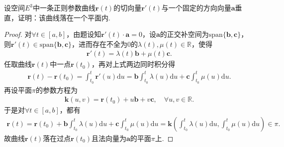 \documentclass[../../main.tex]{subfiles}%
\begin{document}
\begin{example}
设空间$E^3$中一条正则参数曲线$\bm{r}(t)$的切向量$\bm{r}'(t)$与一个固定的方向向量$\bm{a}$垂直，证明：该曲线落在一个平面内.
\end{example}
\begin{proof}

对$\forall t\in[a,b]$，由题设知$\boldsymbol{r}'(t)\cdot\boldsymbol{a}=0$，设$\boldsymbol{a}$的正交补空间为$\mathrm{span}\{\boldsymbol{b},\boldsymbol{c}\}$，则$\boldsymbol{r}'(t)\in\mathrm{span}\{\boldsymbol{b},\boldsymbol{c}\}$，进而存在不全为0的$\lambda(t),\mu(t)\in\mathbb{R}$，使得\begin{align*}
\boldsymbol{r}'(t)=\lambda(t)\boldsymbol{b}+\mu(t)\boldsymbol{c}.
\end{align*}
任取曲线$\boldsymbol{r}(t)$中一点$\boldsymbol{r}(t_0)$，再对上式两边同时积分得\begin{align*}
\boldsymbol{r}(t)-\boldsymbol{r}(t_0)=\int_{t_0}^t\boldsymbol{r}'(u)\mathrm{d}u=\boldsymbol{b}\int_{t_0}^t\lambda(u)\mathrm{d}u+\boldsymbol{c}\int_{t_0}^t\mu(u)\mathrm{d}u.
\end{align*}
再设平面$\pi$的参数方程为\begin{align*}
\boldsymbol{k}(u,v)=\boldsymbol{r}(t_0)+u\boldsymbol{b}+v\boldsymbol{c},\quad \forall u,v\in\mathbb{R}.
\end{align*}
于是对$\forall t\in[a,b]$，都有\begin{align*}
\boldsymbol{r}(t)=\boldsymbol{r}(t_0)+\boldsymbol{b}\int_{t_0}^t\lambda(u)\mathrm{d}u+\boldsymbol{c}\int_{t_0}^t\mu(u)\mathrm{d}u=\boldsymbol{k}\left(\int_{t_0}^t\lambda(u)\mathrm{d}u,\int_{t_0}^t\mu(u)\mathrm{d}u\right)\in\pi.
\end{align*}
故曲线$\boldsymbol{r}(t)$落在过点$\boldsymbol{r}(t_0)$且法向量为$\boldsymbol{a}$的平面$\pi$上.

\end{proof}
\end{document}
